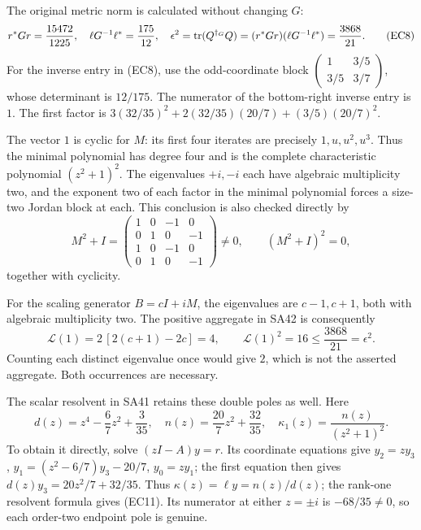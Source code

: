 The original metric norm is calculated without changing \(G\):
\begin{equation}
 r^*Gr=\frac{15472}{1225},\quad
 \ell G^{-1}\ell^*=\frac{175}{12},\quad
 \epsilon^2=\operatorname{tr}(Q^{\dagger_G}Q)
     =(r^*Gr)(\ell G^{-1}\ell^*)=\frac{3868}{21}.
 \tag{EC8}
\end{equation}
For the inverse entry in (EC8), use the odd-coordinate block
\(\left(\begin{smallmatrix}1&3/5\\3/5&3/7\end{smallmatrix}\right)\),
whose determinant is \(12/175\). The numerator of the bottom-right
inverse entry is \(1\). The first factor is
\(3(32/35)^2+2(32/35)(20/7)+(3/5)(20/7)^2\).

The vector \(1\) is cyclic for \(M\): its first four iterates
are precisely \(1,u,u^2,u^3\). Thus the minimal polynomial has
degree four and is the complete characteristic polynomial
\((z^2+1)^2\). The eigenvalues \(+i,-i\) each have algebraic
multiplicity two, and the exponent two of each factor in the
minimal polynomial forces a size-two Jordan block at each.
This conclusion is also checked directly by
\begin{equation}
 M^2+I=
 \begin{pmatrix}
 1&0&-1&0\\0&1&0&-1\\1&0&-1&0\\0&1&0&-1
 \end{pmatrix}\ne0,\qquad (M^2+I)^2=0,
 \tag{EC9}
\end{equation}
together with cyclicity.

For the scaling generator \(B=cI+iM\), the eigenvalues are
\(c-1,c+1\), both with algebraic multiplicity two. The
positive aggregate in SA42 is consequently
\begin{equation}
 \mathcal L(1)=2\,[2(c+1)-2c]=4,\qquad
 \mathcal L(1)^2=16\le\frac{3868}{21}=\epsilon^2 .
 \tag{EC10}
\end{equation}
Counting each distinct eigenvalue once would give \(2\), which is
not the asserted aggregate. Both occurrences are necessary.

The scalar resolvent in SA41 retains these double poles as well.
Here
\begin{equation}
 d(z)=z^4-\frac67z^2+\frac3{35},\quad
 n(z)=\frac{20}{7}z^2+\frac{32}{35},\quad
 \kappa_1(z)=\frac{n(z)}{(z^2+1)^2}.
 \tag{EC11}
\end{equation}
To obtain it directly, solve \((zI-A)y=r\). Its coordinate
equations give \(y_2=zy_3\),
\(y_1=(z^2-6/7)y_3-20/7\), \(y_0=zy_1\);
the first equation then gives
\(d(z)y_3=20z^2/7+32/35\).
Thus \(\kappa(z)=\ell y=n(z)/d(z)\);
the rank-one resolvent formula gives (EC11).
Its numerator at either \(z=\pm i\) is \(-68/35\ne0\), so
each order-two endpoint pole is genuine.

